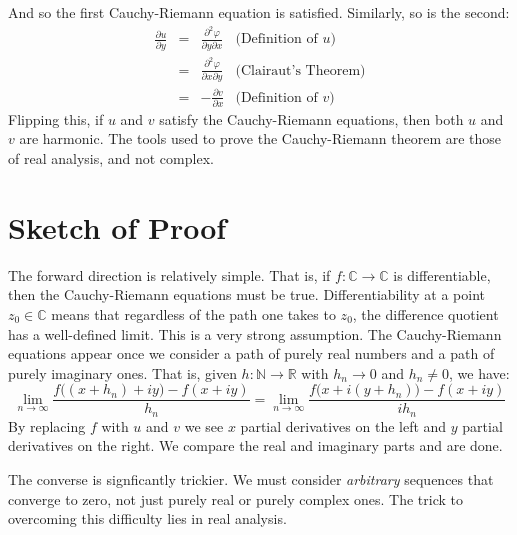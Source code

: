 \documentclass{article}
\theoremstyle{definition}
\begin{document}
            And so the first Cauchy-Riemann equation is satisfied. Similarly,
            so is the second:
            \begin{equation}
                \begin{array}{rcll}
                    \displaystyle
                    \frac{\partial{u}}{\partial{y}}
                    &=&
                    \displaystyle
                    \frac{\partial^{2}\varphi}{\partial{y}\partial{x}}
                    &
                    \textrm{(Definition of $u$)}\\[2em]
                    &=&
                    \displaystyle
                    \frac{\partial^{2}\varphi}{\partial{x}\partial{y}}
                    &
                    \textrm{(Clairaut's Theorem)}\\[2em]
                    &=&
                    \displaystyle
                    -\frac{\partial{v}}{\partial{x}}
                    &
                    \textrm{(Definition of $v$)}
                \end{array}
            \end{equation}
            Flipping this, if $u$ and $v$ satisfy the Cauchy-Riemann
            equations, then both $u$ and $v$ are harmonic. The tools used to
            prove the Cauchy-Riemann theorem are those of real analysis, and
            not complex.
    \section{Sketch of Proof}
        The forward direction is relatively simple. That is, if
        $f:\mathbb{C}\rightarrow\mathbb{C}$ is differentiable, then the
        Cauchy-Riemann equations must be true. Differentiability at a point
        $z_{0}\in\mathbb{C}$ means that regardless of the path one takes to
        $z_{0}$, the difference quotient has a well-defined limit. This is
        a very strong assumption. The Cauchy-Riemann equations appear once we
        consider a path of purely real numbers and a path of purely imaginary
        ones. That is, given $h:\mathbb{N}\rightarrow\mathbb{R}$ with
        $h_{n}\rightarrow{0}$ and $h_{n}\ne{0}$, we have:
        \begin{equation}
            \lim_{n\rightarrow\infty}
            \frac{f\big((x+h_{n})+iy)-f(x+iy)}{h_{n}}
            =
            \lim_{n\rightarrow\infty}
            \frac{f\big(x+i(y+h_{n}))-f(x+iy)}{ih_{n}}
        \end{equation}
        By replacing $f$ with $u$ and $v$ we see $x$ partial derivatives on
        the left and $y$ partial derivatives on the right. We compare the
        real and imaginary parts and are done.
        \par\hfill\par
        The converse is signficantly trickier. We must consider
        \textit{arbitrary} sequences that converge to zero, not just purely
        real or purely complex ones. The trick to overcoming this difficulty
        lies in real analysis.
\end{document}
